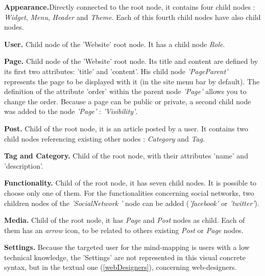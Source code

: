 						\vspace{0.15em}
						\noindent\textbf{Appearance.}Directly connected to the root node, it contains four child nodes : \textit{Widget}, 
							\textit{Menu}, \textit{Header} and \textit{Theme}. Each of this fourth child nodes have also child 	nodes. 
											
						\vspace{0.15em}
						\noindent\textbf{User.} Child node of the 'Website' root node. It has a child node \textit{Role}.
						
						\vspace{0.15em}
						\noindent\textbf{Page.} Child node of the 'Website' root node. Its title and content
						are defined by its first two attributes: 'title' and 'content'. His child node \textit{'PageParent'}
						represents the page to be displayed with it (in the site menu bar by default). The definition of the attribute 
						'order' within the parent node \textit{'Page'} allows you to change the order. Because a page can be public or 
						private, a second child node was added to the node \textit{'Page'} : \textit{'Visibility'}.
						
						\vspace{0.15em}
						\noindent\textbf{Post.} Child of the root node, it is an article posted by a user. It contains two child nodes
						referencing existing other nodes : \textit{Category} and \textit{Tag}.						
						
						\vspace{0.15em}
						\noindent\textbf{Tag and Category.} Child of the root node, with their attributes 'name' and 'description'.
																						
						\vspace{0.15em}
						\noindent\textbf{Functionality.} Child of the root node, it has seven child nodes. It is possible to choose only 		
						one of them. For the functionalities concerning social networks, two children nodes of the \textit{'SocialNetwork '} 
						node can be	added (\textit{'facebook'} or \textit{'twitter'}).	
						
						\vspace{0.15em}
						\noindent\textbf{Media.} Child of the root node, it has \textit{Page} and \textit{Post} nodes as child. Each of
						them has an \textit{arrow} icon, to be related to others existing \textit{Post} or \textit{Page} nodes.
									
						\vspace{0.15em}
						\noindent\textbf{Settings.} Because the targeted user for the mind-mapping is users with a low technical knowledge, 							the 'Settings' are not represented in this visual concrete syntax, but in the textual one (\ref{webDesigners}), 								concerning web-designers.						
										
